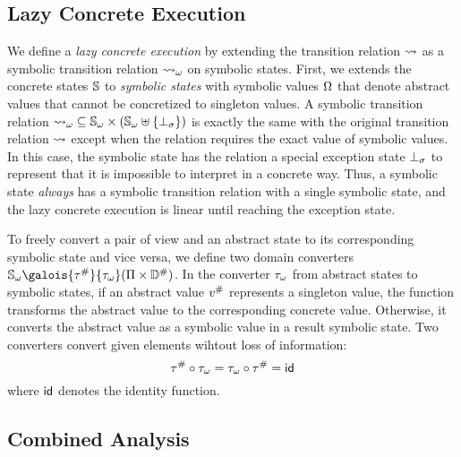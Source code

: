 \subsection{Lazy Concrete Execution}

We define a \textit{lazy concrete execution} by extending the transition
relation $\leadsto$ as a symbolic transition relation ${\leadsto}_\omega$ on symbolic
states. First, we extends the concrete states $\mathbb{S}$ to \textit{symbolic
states} with symbolic values $\Omega$ that denote abstract values that cannot be
concretized to singleton values. A symbolic transition relation ${\leadsto}_\omega
\subseteq {\mathbb{S}}_\omega \times ({\mathbb{S}}_\omega \uplus \{ \bot_\sigma \})$ is exactly the same
with the original transition relation $\leadsto$ except when the relation requires
the exact value of symbolic values.  In this case, the symbolic state has the
relation a special exception state $\bot_\sigma$ to represent that it is impossible
to interpret in a concrete way.  Thus, a symbolic state \textit{always} has a
symbolic transition relation with a single symbolic state, and the lazy concrete
execution is linear until reaching the exception state.

To freely convert a pair of view and an abstract state to its corresponding
symbolic state and vice versa, we define two domain converters $\symbstset
\galois{\saconverter}{\asconverter} (\viewset \times \absdom)$.  In the
converter ${\tau}_\omega$ from abstract states to symbolic states, if an abstract
value ${v}^{\#}$ represents a singleton value, the function transforms the
abstract value to the corresponding concrete value.  Otherwise, it converts the
abstract value as a symbolic value in a result symbolic state.  Two converters
convert given elements wihtout loss of information:
\[
  {\tau}^{\#} \circ {\tau}_\omega = {\tau}_\omega \circ {\tau}^{\#} = \textsf{id}
\]
where $\textsf{id}$ denotes the identity function.


\subsection{Combined Analysis}

